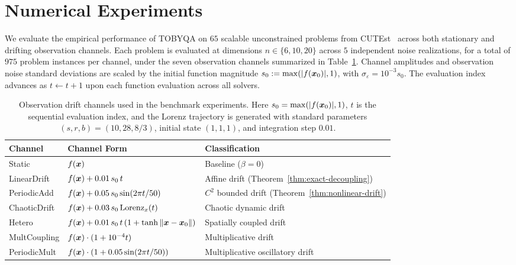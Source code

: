 \section{Numerical Experiments}
\label{sec:experiments}

We evaluate the empirical performance of TOBYQA on $65$ scalable unconstrained problems from CUTEst~\cite{GouldOrbanToint2015} across both stationary and drifting observation channels. Each problem is evaluated at dimensions $n \in \{6, 10, 20\}$ across $5$ independent noise realizations, for a total of $975$ problem instances per channel, under the seven observation channels summarized in Table~\ref{tab:envs}. Channel amplitudes and observation noise standard deviations are scaled by the initial function magnitude $s_0 := \max(|f(\boldsymbol{x}_0)|, 1)$, with $\sigma_\varepsilon = 10^{-3} s_0$. The evaluation index advances as $t \leftarrow t + 1$ upon each function evaluation across all solvers.

\begin{table}[t]
  \centering\small
  \caption{Observation drift channels used in the benchmark experiments. Here $s_0 = \max(|f(\boldsymbol{x}_0)|, 1)$, $t$ is the sequential evaluation index, and the Lorenz trajectory is generated with standard parameters $(s, r, b) = (10, 28, 8/3)$, initial state $(1,1,1)$, and integration step $0.01$.}
  \label{tab:envs}
  \begin{tabular}{lll}
    \toprule
    Channel & Channel Form & Classification \\
    \midrule
    Static        & $f(\boldsymbol{x})$                                      & Baseline ($\beta = 0$) \\
    LinearDrift   & $f(\boldsymbol{x}) + 0.01\,s_0\,t$                       & Affine drift (Theorem~\ref{thm:exact-decoupling}) \\
    PeriodicAdd   & $f(\boldsymbol{x}) + 0.05\,s_0\sin(2\pi t/50)$           & $C^2$ bounded drift (Theorem~\ref{thm:nonlinear-drift}) \\
    ChaoticDrift  & $f(\boldsymbol{x}) + 0.03\,s_0\,\mathrm{Lorenz}_x(t)$    & Chaotic dynamic drift \\
    Hetero        & $f(\boldsymbol{x}) + 0.01\,s_0\,t\,(1+\tanh\|\boldsymbol{x}-\boldsymbol{x}_0\|)$   & Spatially coupled drift \\
    MultCoupling  & $f(\boldsymbol{x})\cdot(1 + 10^{-4}t)$                   & Multiplicative drift \\
    PeriodicMult  & $f(\boldsymbol{x})\cdot(1 + 0.05\sin(2\pi t/50))$        & Multiplicative oscillatory drift \\
    \bottomrule
  \end{tabular}
\end{table}

